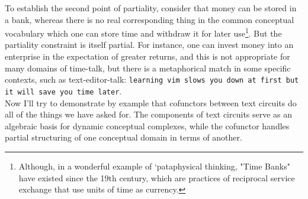 To establish the second point of partiality, consider that money can be stored in a bank, whereas there is no real corresponding thing in the common conceptual vocabulary which one can store time and withdraw it for later use\footnote{Although, in a wonderful example of `pataphysical thinking, "Time Banks" have existed since the 19th century, which are practices of reciprocal service exchange that use units of time as currency.}. But the partiality constraint is itself partial. For instance, one can invest money into an enterprise in the expectation of greater returns, and this is not appropriate for many domains of time-talk, but there is a metaphorical match in some specific contexts, such as text-editor-talk: \texttt{learning vim slows you down at first but it will save you time later}.\\

Now I'll try to demonstrate by example that cofunctors between text circuits do all of the things we have asked for. The components of text circuits serve as an algebraic basis for dynamic conceptual complexes, while the cofunctor handles partial structuring of one conceptual domain in terms of another.

